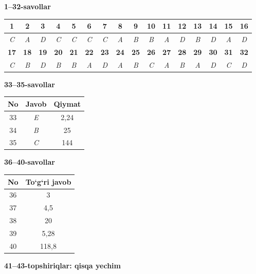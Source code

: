 \documentclass[11pt,a4paper]{article}
\begin{document}
\noindent\textbf{1--32-savollar}\par\smallskip
\noindent\begin{tabular}{|c|c|c|c|c|c|c|c|c|c|c|c|c|c|c|c|}\hline
\textbf{1} & \textbf{2} & \textbf{3} & \textbf{4} & \textbf{5} & \textbf{6} & \textbf{7} & \textbf{8} & \textbf{9} & \textbf{10} & \textbf{11} & \textbf{12} & \textbf{13} & \textbf{14} & \textbf{15} & \textbf{16}\\\hline
\textsl{C} & \textsl{A} & \textsl{D} & \textsl{C} & \textsl{C} & \textsl{C} & \textsl{C} & \textsl{A} & \textsl{B} & \textsl{B} & \textsl{A} & \textsl{D} & \textsl{B} & \textsl{D} & \textsl{A} & \textsl{D}\\\hline
\textbf{17} & \textbf{18} & \textbf{19} & \textbf{20} & \textbf{21} & \textbf{22} & \textbf{23} & \textbf{24} & \textbf{25} & \textbf{26} & \textbf{27} & \textbf{28} & \textbf{29} & \textbf{30} & \textbf{31} & \textbf{32}\\\hline
\textsl{C} & \textsl{B} & \textsl{D} & \textsl{B} & \textsl{B} & \textsl{A} & \textsl{D} & \textsl{A} & \textsl{B} & \textsl{C} & \textsl{A} & \textsl{B} & \textsl{A} & \textsl{D} & \textsl{C} & \textsl{D}\\\hline
\end{tabular}\par\medskip
\noindent\textbf{33--35-savollar}\par\smallskip
\noindent\begin{tabular}{|c|c|c|}\hline \textbf{No} & \textbf{Javob} & \textbf{Qiymat}\\\hline
33 & \textsl{E} & 2,24\\\hline
34 & \textsl{B} & 25\\\hline
35 & \textsl{C} & 144\\\hline
\end{tabular}\par\medskip
\noindent\textbf{36--40-savollar}\par\smallskip
\noindent\begin{tabular}{|c|c|}\hline \textbf{No} & \textbf{To`g`ri javob}\\\hline
36 & 3\\\hline
37 & 4,5\\\hline
38 & 20\\\hline
39 & 5,28\\\hline
40 & 118,8\\\hline
\end{tabular}\par\medskip
\noindent\textbf{41--43-topshiriqlar: qisqa yechim}\par\smallskip
\end{document}
